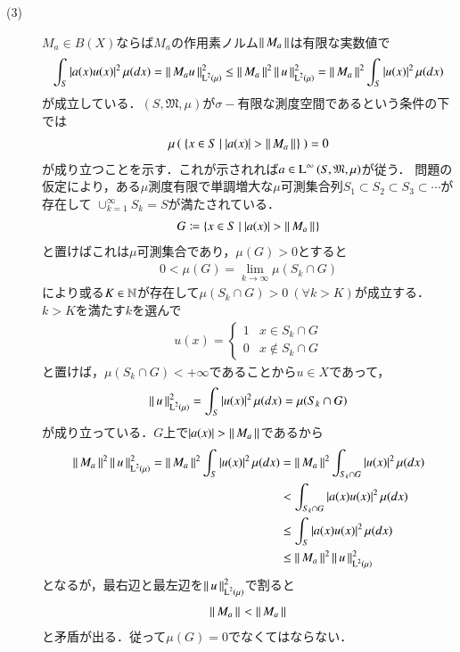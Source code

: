 \begin{prf}
\begin{description}
	\item[(3)] $M_a \in B(X)$ならば$M_a$の作用素ノルム$\left\|\, M_a\, \right\|_{}$は有限な実数値で
		\begin{align}
			\int_{S} |a(x)u(x)|^2\, \mu(dx) 
			= \left\|\, M_au\, \right\|_{\operatorname{L}^{2} \left(\mu\right)}^2 \leq \left\|\, M_a\, \right\|_{}^2 \left\|\, u\, \right\|_{\operatorname{L}^{2} \left(\mu\right)}^2 
			= \left\|\, M_a\, \right\|_{}^2 \int_{S} |u(x)|^2\, \mu(dx)
		\end{align}
		が成立している．$(S, \mathfrak{M}, \mu)$が$\sigma-$有限な測度空間であるという条件の下では
		\begin{align}
			\mu\left(\ \{x \in S\ |\ |a(x)| > \left\|\, M_a\, \right\|_{}\}\ \right) = 0
		\end{align}
		が成り立つことを示す．これが示されれば$a \in \operatorname{L}^{\infty} \left(S, \mathfrak{M}, \mu\right)$が従う．
		問題の仮定により，ある$\mu$測度有限で単調増大な$\mu$可測集合列$S_1 \subset S_2 \subset S_3 \subset \cdots$が存在して
		$\cup_{k=1}^{\infty}S_k = S$が満たされている．
		\begin{align}
			G \coloneqq \{x \in S\ |\ |a(x)| > \left\|\, M_a\, \right\|_{}\}
		\end{align}
		と置けばこれは$\mu$可測集合であり，$\mu(G) > 0$とすると
		\begin{align}
			0 < \mu(G) = \lim_{k \to \infty} \mu(S_k \cap G)
		\end{align}
		により或る$K \in \mathbb{N}$が存在して$\mu(S_k \cap G) > 0 \ (\forall k > K)$が成立する．$k > K$を満たす$k$を選んで
		\begin{align}
			u(x) = \begin{cases}
				1 & x \in S_k \cap G \\
				0 & x \notin S_k \cap G
			\end{cases}
		\end{align}
		と置けば，$\mu(S_k \cap G) < +\infty$であることから$u \in X$であって，
		\begin{align}
			\left\|\, u\, \right\|_{\operatorname{L}^{2} \left(\mu\right)}^2 = \int_{S} |u(x)|^2\, \mu(dx) = \mu(S_k \cap G)
		\end{align}
		が成り立っている．$G$上で$|a(x)| > \left\|\, M_a\, \right\|_{}$であるから
		\begin{align}
			\left\|\, M_a\, \right\|_{}^2 \left\|\, u\, \right\|_{\operatorname{L}^{2} \left(\mu\right)}^2 
			= \left\|\, M_a\, \right\|_{}^2 \int_{S} |u(x)|^2\, \mu(dx) 
			&= \left\|\, M_a\, \right\|_{}^2 \int_{S_k \cap G} |u(x)|^2\, \mu(dx) \\
			&< \int_{S_k \cap G} |a(x)u(x)|^2\, \mu(dx) \\
			&\leq \int_{S} |a(x)u(x)|^2\, \mu(dx) \\
			&\leq \left\|\, M_a\, \right\|_{}^2 \left\|\, u\, \right\|_{\operatorname{L}^{2} \left(\mu\right)}^2 
		\end{align}
		となるが，最右辺と最左辺を$\left\|\, u\, \right\|_{\operatorname{L}^{2} \left(\mu\right)}^2$で割ると
		\begin{align}
			\left\|\, M_a\, \right\|_{} < \left\|\, M_a\, \right\|_{}
		\end{align}
		と矛盾が出る．従って$\mu(G)=0$でなくてはならない．
		\QED
\end{description}
\end{prf}

